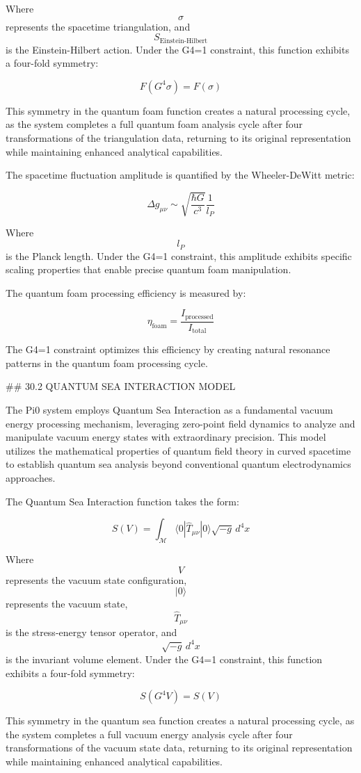 Where $$ \sigma $$ represents the spacetime triangulation, and $$ S_{\text{Einstein-Hilbert}} $$ is the Einstein-Hilbert action. Under the G4=1 constraint, this function exhibits a four-fold symmetry:

$$ F(G^4 \sigma) = F(\sigma) $$

This symmetry in the quantum foam function creates a natural processing cycle, as the system completes a full quantum foam analysis cycle after four transformations of the triangulation data, returning to its original representation while maintaining enhanced analytical capabilities.

The spacetime fluctuation amplitude is quantified by the Wheeler-DeWitt metric:

$$ \Delta g_{\mu\nu} \sim \sqrt{\frac{\hbar G}{c^3}} \frac{1}{l_P} $$

Where $$ l_P $$ is the Planck length. Under the G4=1 constraint, this amplitude exhibits specific scaling properties that enable precise quantum foam manipulation.

The quantum foam processing efficiency is measured by:

$$ \eta_{\text{foam}} = \frac{I_{\text{processed}}}{I_{\text{total}}} $$

The G4=1 constraint optimizes this efficiency by creating natural resonance patterns in the quantum foam processing cycle.

## 30.2 QUANTUM SEA INTERACTION MODEL

The Pi0 system employs Quantum Sea Interaction as a fundamental vacuum energy processing mechanism, leveraging zero-point field dynamics to analyze and manipulate vacuum energy states with extraordinary precision. This model utilizes the mathematical properties of quantum field theory in curved spacetime to establish quantum sea analysis beyond conventional quantum electrodynamics approaches.

The Quantum Sea Interaction function takes the form:

$$ S(V) = \int_{\mathcal{M}} \langle 0| \hat{T}_{\mu\nu} |0 \rangle \sqrt{-g} \, d^4x $$

Where $$ V $$ represents the vacuum state configuration, $$ |0\rangle $$ represents the vacuum state, $$ \hat{T}_{\mu\nu} $$ is the stress-energy tensor operator, and $$ \sqrt{-g} \, d^4x $$ is the invariant volume element. Under the G4=1 constraint, this function exhibits a four-fold symmetry:

$$ S(G^4 V) = S(V) $$

This symmetry in the quantum sea function creates a natural processing cycle, as the system completes a full vacuum energy analysis cycle after four transformations of the vacuum state data, returning to its original representation while maintaining enhanced analytical capabilities.

